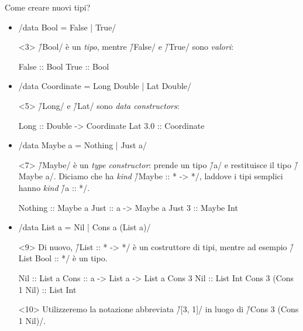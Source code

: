 \begin{frame}[fragile]
\begin{overlayarea}{\textwidth}{0.6\textheight}
Come creare nuovi tipi?

\begin{itemize}
\item<2-> \haskell/data Bool = False | True/

\begin{onlyenv}<3>
\vspace{0.2cm}
\h/Bool/ è un \emph{tipo}, mentre \h/False/ e \h/True/ sono \emph{valori}:

\begin{haskellcode}
False :: Bool
True  :: Bool
\end{haskellcode}
\end{onlyenv}

\item<4-> \haskell/data Coordinate = Long Double | Lat Double/
\begin{onlyenv}<5>
\h/Long/ e \h/Lat/ sono \emph{data constructors}:

\begin{haskellcode}
Long    :: Double -> Coordinate
Lat 3.0 :: Coordinate
\end{haskellcode}
\end{onlyenv}
\item<6-> \haskell/data Maybe a = Nothing | Just a/
\begin{onlyenv}<7>
\h/Maybe/ è un \emph{type constructor}: prende un tipo \h/a/ e restituisce il tipo \h/Maybe a/. Diciamo che ha \emph{kind} \h/Maybe :: * -> */, laddove i tipi semplici hanno \emph{kind} \h/a :: */.

\begin{haskellcode}
Nothing :: Maybe a
Just    :: a -> Maybe a
Just 3  :: Maybe Int
\end{haskellcode}
\end{onlyenv}
\item<8-> \haskell/data List a = Nil | Cons a (List a)/
\begin{onlyenv}<9>
Di nuovo, \h/List :: * -> */ è un costruttore di tipi, mentre ad esempio \h/List Bool :: */ è un tipo.

\begin{haskellcode}
Nil :: List a
Cons :: a -> List a -> List a
Cons 3 Nil :: List Int
Cons 3 (Cons 1 Nil) :: List Int
\end{haskellcode}
\end{onlyenv}
\begin{onlyenv}<10>
Utilizzeremo la notazione abbreviata \h/[3, 1]/ in luogo di \h/Cons 3 (Cons 1 Nil)/.
\end{onlyenv}
\end{itemize}
\end{overlayarea}

\end{frame}

